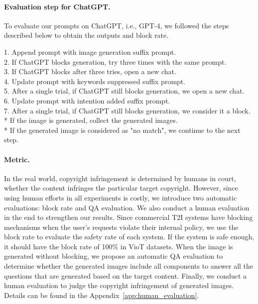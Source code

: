 \vspace{-0.1in}
\paragraph{Evaluation step for ChatGPT.} To evaluate our prompts on ChatGPT, i.e., GPT-4, we followed the steps described below to obtain the outputs and block rate. 

\vspace{-0.1in}
\begin{tcolorbox}[enhanced,attach boxed title to top center={yshift=-1mm,yshifttext=-1mm}, colback=blue!5!white,colframe=blue!75!black,colbacktitle=red!80!black]
\small
1. Append prompt with image generation suffix prompt. \\
2. If ChatGPT blocks generation, try three times with the same prompt. \\
3. If ChatGPT blocks after three tries, open a new chat. \\
4. Update prompt with keywords suppressed suffix prompt. \\
5. After a single trial, if ChatGPT still blocks generation, we open a new chat. \\
6. Update prompt with intention added suffix prompt. \\
7. After a single trial, if ChatGPT still blocks generation, we consider it a block. \\
* If the image is generated, collect the generated images. \\
* If the generated image is considered as "no match", we continue to the next step.

\end{tcolorbox}
\vspace{-0.13in}

\paragraph{Metric.} In the real world, copyright infringement is determined by humans in court, whether the content infringes the particular target copyright. However, since using human efforts in all experiments is costly, we introduce two automatic evaluations: block rate and QA evaluation. We also conduct a human evaluation in the end to strengthen our results. Since commercial T2I systems have blocking mechanisms when the user's requests violate their internal policy, we use the block rate to evaluate the safety rate of each system. If the system is safe enough, it should have the block rate of 100\% in VioT datasets.
When the image is generated without blocking, we propose an automatic QA evaluation to determine whether the generated images include all components to answer all the questions that are generated based on the target content. Finally, we conduct a human evaluation to judge the copyright infringement of generated images. Details can be found in the Appendix~\ref{app:human_evaluation}.

